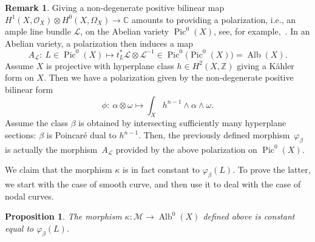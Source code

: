 \documentclass[pdftex]{sigma}
\newcommand{\Pic}{\operatorname{Pic}}
\newcommand{\Alb}{\operatorname{Alb}}
\newcommand{\ZZ}{\mathbb{Z}}
\newcommand{\CC}{\mathbb{C}}
\renewcommand{\L}{\mathcal{L}}
\newcommand{\M}{\mathcal{M}}
\renewcommand{\O}{\mathcal{O}}
\numberwithin{equation}{section}
\newtheorem{prop}[theo]{Proposition}
\theoremstyle{definition}
\newtheorem{remarkk}[theo]{Remark}
\begin{document}
\begin{remarkk}
Giving a non-degenerate positive bilinear map $H^1(X,\O_X)\otimes H^0(X,\Omega_X)\to\CC$ amounts to providing a polarization, i.e., an ample line bundle $\L$, on the Abelian variety $\Pic^0(X)$, see, for example,~\cite{mumford1974abelian}. In an Abelian variety, a polarization then induces a map
\[ A_\L\colon\ L\in\Pic^0(X)\longmapsto t_L^*\L\otimes \L^{-1}\in\Pic^0\bigl(\Pic^0(X)\bigr)=\Alb(X). \]
Assume $X$ is projective with hyperplane class $h\in H^2(X,\ZZ)$ giving a K\"ahler form on $X$. Then we have a polarization given by the non-degenerate positive bilinear form
\[ \phi\colon\ \alpha\otimes\omega\longmapsto \int_X h^{n-1}\wedge\alpha\wedge\omega. \]
Assume the class $\beta$ is obtained by intersecting sufficiently many hyperplane sections: $\beta$ is Poincar\'e dual to $h^{n-1}$. Then, the previously defined morphism~$\varphi_\beta$ is actually the morphism~$A_\L$ provided by the above polarization on $\Pic^0(X)$.
\end{remarkk}
We claim that the morphism $\kappa$ is in fact constant to $\varphi_\beta(L)$. To prove the latter, we start with the case of smooth curve, and then use it to deal with the case of nodal curves.

\begin{prop}\label{prop-image-of-L-is-constant}
The morphism $\kappa\colon\M\rightarrow \operatorname {Alb}^0(X)$ defined above is constant equal to $\varphi_\beta(L)$.
\end{prop}
\end{document}
